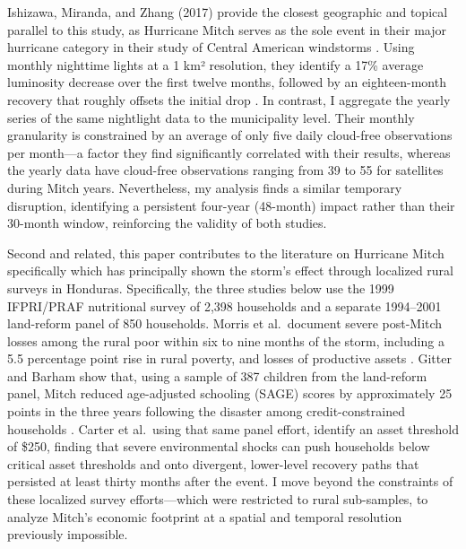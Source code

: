 \documentclass[12pt]{article}
\begin{document}
Ishizawa, Miranda, and Zhang (2017) provide the closest geographic and topical parallel to this study, as Hurricane Mitch serves as the sole event in their major hurricane category in their study of Central American windstorms \citeyear{ishizawa2017windstorms}. Using monthly nighttime lights at a 1 km² resolution, they identify a 17\% average luminosity decrease over the first twelve months, followed by an eighteen-month recovery that roughly offsets the initial drop \parencite{ishizawa2017windstorms}. In contrast, I aggregate the yearly series of the same nightlight data to the municipality level. Their monthly granularity is constrained by an average of only five daily cloud-free observations per month—a factor they find significantly correlated with their results, whereas the yearly data have cloud-free observations ranging from 39 to 55 for satellites during Mitch years. Nevertheless, my analysis finds a similar temporary disruption, identifying a persistent four-year (48-month) impact rather than their 30-month window, reinforcing the validity of both studies. 

Second and related, this paper contributes to the literature on Hurricane Mitch specifically which has principally shown the storm's effect through localized rural surveys in Honduras. Specifically, the three studies below use the 1999 IFPRI/PRAF nutritional survey of 2,398 households and a separate 1994–2001 land-reform panel of 850 households.  Morris et al.\ document severe post-Mitch losses among the rural poor within six to nine months of the storm, including a 5.5 percentage point rise in rural poverty, and losses of productive assets \parencite{morris2002mitch}. Gitter and Barham show that, using a sample of 387 children from the land-reform panel, Mitch reduced age-adjusted schooling (SAGE) scores by approximately 25 points in the three years following the disaster among credit-constrained households \parencite{gitter2007credit}. Carter et al.\, using that same panel effort, identify an asset threshold of \$250, finding that severe environmental shocks can push households below critical asset thresholds and onto divergent, lower-level recovery paths that persisted at least thirty months after the event. I move beyond the constraints of these localized survey efforts—which were restricted to rural sub-samples, to analyze Mitch’s economic footprint at a spatial and temporal resolution previously impossible. 
\end{document}
